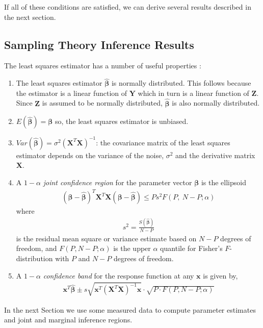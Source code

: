 If all of these conditions are satisfied, we can derive several results
described in the next section.

\subsection{Sampling Theory Inference
Results}\label{sampling-theory-inference-results}
The least squares estimator has a number of useful properties \cite{seber1977}:

\begin{enumerate}
\def\labelenumi{\arabic{enumi}.}
\item
  The least squares estimator \(\widehat{\boldsymbol{\beta}}\) is normally
  distributed. This follows because the estimator is a linear function
  of \(\boldsymbol{Y}\) which in turn is a linear function of
  \(\boldsymbol{Z}\). Since \(\boldsymbol{Z}\) is assumed to be normally
  distributed, \(\widehat{\boldsymbol{\beta}}\) is also normally
  distributed.
\item
  \(E\left( \widehat{\boldsymbol{\beta}} \right) = \boldsymbol{\beta}\) so, the
  least squares estimator is unbiased.
\item
  \(Var\left( \widehat{\boldsymbol{\beta}} \right) = \sigma^{2}\left( \boldsymbol{X}^{T}\boldsymbol{X} \right)^{- 1}\):
  the covariance matrix of the least squares estimator depends on the
  variance of the noise, \(\sigma^{2}\) and the derivative matrix
  \(\boldsymbol{X}\).
\item
A \(1-\alpha\) \emph{joint confidence region} for the parameter vector \(\boldsymbol{\beta}\) is the ellipsoid
\begin{align}
\left( \boldsymbol{\beta} - \widehat{\boldsymbol{\beta}} \right)^{T}\boldsymbol{X}^{T}\boldsymbol{X}\left( \boldsymbol{\beta} - \widehat{\boldsymbol{\beta}} \right) \leq Ps^{2}F(P,\ N - P;\alpha)
\end{align}
where
\begin{align}
s^2 = \frac{S(\widehat{\boldsymbol{\beta}})}{N-P}
\end{align}
is the residual mean square or variance estimate based on \(N-P\) degrees of freedom, 
and \(F(P, N-P; \alpha)\) is the upper \(\alpha\) quantile for Fisher’s \(F\)-distribution with \(P\) and \(N-P\) degrees of freedom.
\item
A \(1-\alpha\) \emph{confidence band} for the response function at any \(\boldsymbol{x}\) is given by,
\begin{align}
\boldsymbol{x}^{T}\widehat{\boldsymbol{\beta}} \pm s\sqrt{\boldsymbol{x}^{T}\left( \boldsymbol{X}^{T}\boldsymbol{X} \right)^{- 1}\boldsymbol{x}} \cdot \sqrt{P \cdot F(P,N - P;\alpha)}
\end{align}
\end{enumerate}
In the next Section we use some measured data to compute parameter
estimates and joint and marginal inference regions.

